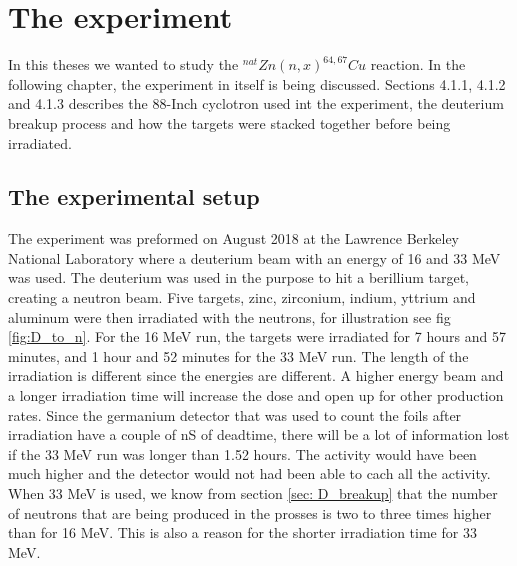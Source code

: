 \documentclass[twoside,english]{uiofysmaster/uiofysmaster}
\begin{document}

\chapter{The experiment}
\label{ch: experiment}

In this theses we wanted to study the $^{nat}Zn(n,x)^{64,67}Cu$ reaction. 
In the following chapter, the experiment in itself is being discussed. Sections 4.1.1, 4.1.2 and 4.1.3 describes the 88-Inch cyclotron used int the experiment, the deuterium breakup process and how the targets were stacked together before being irradiated.


\section{The experimental setup}
\label{sec: setup}

The experiment was preformed on August 2018 at the Lawrence Berkeley National Laboratory where a deuterium beam with an energy of 16 and 33 MeV was used. The deuterium was used in the purpose to hit a berillium target, creating a neutron beam. Five targets, zinc, zirconium, indium, yttrium and aluminum were then irradiated with the neutrons, for illustration see fig \ref{fig:D_to_n}. For the 16 MeV run, the targets were irradiated for 7 hours and 57 minutes, and 1 hour and 52 minutes for the 33 MeV run. The length of the irradiation is different since the energies are different. A higher energy beam and a longer irradiation time will increase the dose and open up for other production rates. Since the germanium detector that was used to count the foils after irradiation have a couple of nS of deadtime, there will be a lot of information lost if the 33 MeV run was longer than 1.52 hours. The activity would have been much higher and the detector would not had been able to cach all the activity. When 33 MeV is used, we know from section \ref{sec: D_breakup} that the number of neutrons that are being produced in the prosses is two to three times higher than for 16 MeV. This is also a reason for the shorter irradiation time for 33 MeV.
\end{document}
